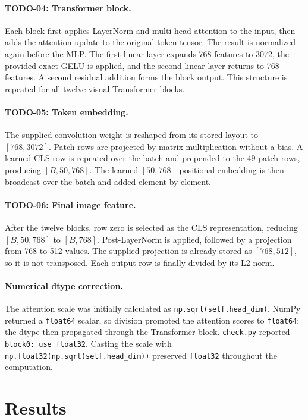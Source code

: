 \documentclass[a4paper,12pt]{article}
\begin{document}
\paragraph{TODO-04: Transformer block.}
Each block first applies LayerNorm and multi-head attention to the input, then
adds the attention update to the original token tensor. The result is normalized
again before the MLP. The first linear layer expands 768 features to 3072, the
provided exact GELU is applied, and the second linear layer returns to 768
features. A second residual addition forms the block output. This structure is
repeated for all twelve visual Transformer blocks.

\paragraph{TODO-05: Token embedding.}
The supplied convolution weight is reshaped from its stored layout to
\([768,3072]\). Patch rows are projected by matrix multiplication without a
bias. A learned CLS row is repeated over the batch and prepended to the 49
patch rows, producing \([B,50,768]\). The learned \([50,768]\) positional
embedding is then broadcast over the batch and added element by element.

\paragraph{TODO-06: Final image feature.}
After the twelve blocks, row zero is selected as the CLS representation,
reducing \([B,50,768]\) to \([B,768]\). Post-LayerNorm is applied, followed by a
projection from 768 to 512 values. The supplied projection is already stored as
\([768,512]\), so it is not transposed. Each output row is finally divided by
its L2 norm.

\paragraph{Numerical dtype correction.}
The attention scale was initially calculated as
\texttt{np.sqrt(self.head\_dim)}. NumPy returned a \texttt{float64} scalar, so
division promoted the attention scores to \texttt{float64}; the dtype then
propagated through the Transformer block. \texttt{check.py} reported
\texttt{block0: use float32}. Casting the scale with
\texttt{np.float32(np.sqrt(self.head\_dim))} preserved \texttt{float32}
throughout the computation.

\section{Results}
\end{document}
